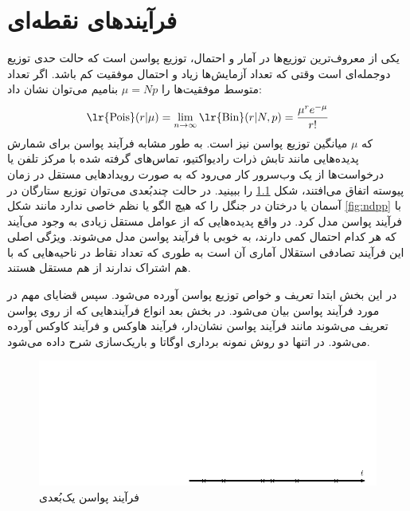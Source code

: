 \chapter{فرآیندهای‌ نقطه‌ای}\label{Chap:App1}

یکی از معروف‌ترین توزیع‌ها در آمار و احتمال، توزیع پواسن است که حالت حدی توزیع دوجمله‌ای است وقتی که تعداد آزمایش‌ها زیاد و احتمال موفقیت کم باشد.  اگر تعداد متوسط موفقیت‌ها را $\mu=Np$ بنامیم می‌توان نشان داد:
\begin{equation}
	\text{\lr{Pois}}	(r|\mu) = \lim_{n\rightarrow\infty} \text{\lr{Bin}}(r|N,p) =  \frac{\mu^r e^{-\mu}}{r!} 
\end{equation}
که $\mu$ میانگین توزیع پواسن نیز است. به طور مشابه فرآیند پواسن برای شمارش پدیده‌هایی مانند تابش ذرات رادیواکتیو، تماس‌های گرفته شده با مرکز تلفن‌‌ یا درخواست‌ها از یک وب‌سرور کار می‌رود که به صورت رویداد‌هایی مستقل در زمان پیوسته اتفاق می‌افتند‌، شکل \ref{fig:2dpp} را ببینید. در حالت چندبُعدی می‌توان توزیع ستارگان در آسمان یا درختان در جنگل را که هیچ الگو یا نظم خاصی ندارد مانند  شکل \ref{fig:ndpp} با فرآیند پواسن مدل کرد. در واقع پدیده‌هایی که از عوامل مستقل زیادی  به وجود می‌آیند که هر کدام احتمال کمی دارند، به خوبی با فرآیند پواسن مدل می‌شوند. ویژگی اصلی این فرآیند تصادفی استقلال آماری آن است به طوری که تعداد نقاط در ناحیه‌هایی که با هم اشتراک ندارند از هم مستقل هستند. 

در این بخش ابتدا تعریف و خواص توزیع پواسن  آورده می‌شود. سپس قضایای مهم در مورد فرآیند پواسن بیان می‌شود. در بخش بعد انواع فرآیندهایی که از روی پواسن تعریف می‌شوند مانند فرآیند پواسن نشان‌دار، فرآیند هاوکس و فرآیند کاوکس آورده می‌شود.  در اتنها دو روش نمونه برداری اوگاتا و باریک‌سازی شرح داده می‌شود.
\begin{figure}
\center
\includegraphics{images/2dpp}
\caption{فرآیند پواسن یک‌بُعدی}
\label{fig:2dpp}
\end{figure}

